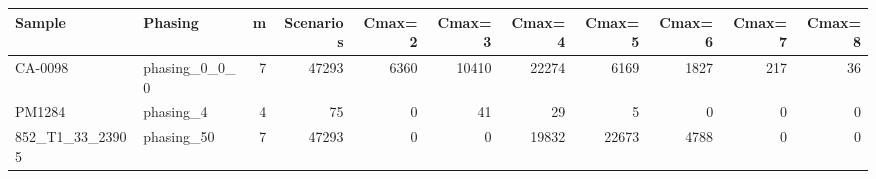 \begin{tabular}{llrrrrrrrrr}
\toprule
Sample & Phasing & m & Scenarios & Cmax=2 & Cmax=3 & Cmax=4 & Cmax=5 & Cmax=6 & Cmax=7 & Cmax=8 \\
\midrule
CA-0098 & phasing\_0\_0\_0 & 7 & 47293 & 6360 & 10410 & 22274 & 6169 & 1827 & 217 & 36 \\
PM1284 & phasing\_4 & 4 & 75 & 0 & 41 & 29 & 5 & 0 & 0 & 0 \\
852\_T1\_33\_23905 & phasing\_50 & 7 & 47293 & 0 & 0 & 19832 & 22673 & 4788 & 0 & 0 \\
\bottomrule
\end{tabular}
